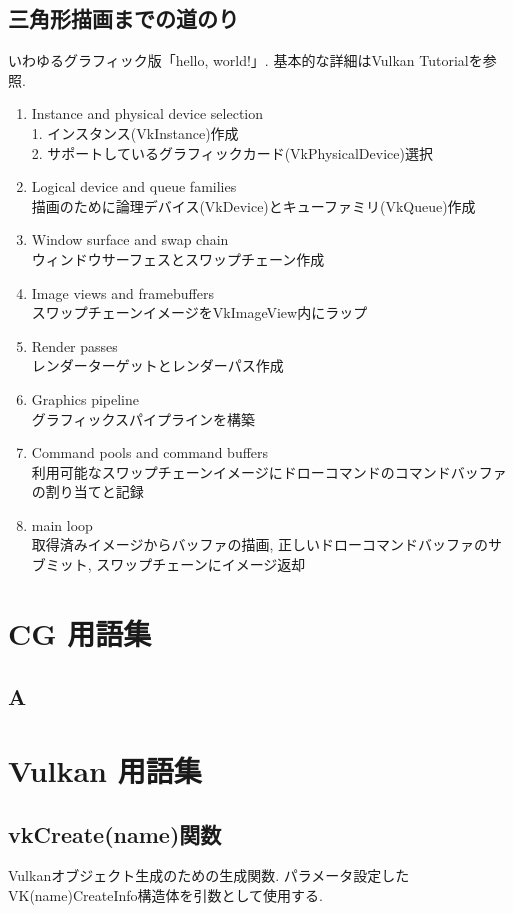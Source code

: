 \documentclass{suribt}
\begin{document}
\section{三角形描画までの道のり}
	いわゆるグラフィック版「hello, world!」.
	基本的な詳細はVulkan Tutorialを参照\cite{1-a}.
\begin{enumerate}
	\item Instance and physical device selection\\
		1. インスタンス(VkInstance)作成\\
		2. サポートしているグラフィックカード(VkPhysicalDevice)選択
	\item Logical device and queue families\\
		描画のために論理デバイス(VkDevice)とキューファミリ(VkQueue)作成
	\item Window surface and swap chain\\
		ウィンドウサーフェスとスワップチェーン作成
	\item Image views and framebuffers\\
		スワップチェーンイメージをVkImageView内にラップ
	\item Render passes\\
		レンダーターゲットとレンダーパス作成
	\item Graphics pipeline\\
		グラフィックスパイプラインを構築
	\item Command pools and command buffers\\
		利用可能なスワップチェーンイメージにドローコマンドのコマンドバッファの割り当てと記録
	\item main loop\\
		取得済みイメージからバッファの描画, 正しいドローコマンドバッファのサブミット, スワップチェーンにイメージ返却
\end{enumerate}
\newpage

\chapter{CG 用語集}\label{chap:2}
\section{A}

\newpage
\chapter{Vulkan 用語集}\label{chap:3}
\section{vkCreate(name)関数}
	Vulkanオブジェクト生成のための生成関数.
	パラメータ設定したVK(name)CreateInfo構造体を引数として使用する.
\end{document}
